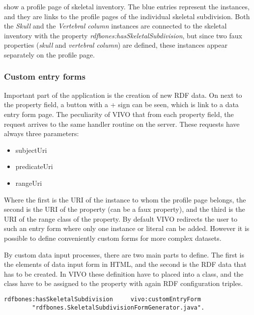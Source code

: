 

 show a profile page of skeletal inventory. The blue entries represent the instances, and they are links to the profile pages of the individual skeletal subdivision. Both the \textit{Skull} and the \textit{Vertebral column} instances are connected to the skeletal inventory with the property \textit{rdfbones:hasSkeletalSubdivision}, but since two faux properties (\textit{skull} and \textit{vertebral column}) are defined, these instances appear separately on the profile page.

\subsubsection{Custom entry forms} \label{vivoCef}

Important part of the application is the creation of new RDF data. On  next to the property field, a button with a + sign can be seen, which is link to a data entry form page. The peculiarity of VIVO that from each property field, the request arrives to the same handler routine on the server. These requests have always three parameters:

\begin{itemize}
	\item{subjectUri}
	\item{predicateUri}
	\item{rangeUri}
\end{itemize}

Where the first is the URI of the instance to whom the profile page belongs, the second is the URI of the property (can be a faux property), and the third is the URI of the range class of the property. By default VIVO redirects the user to such an entry form where only one instance or literal can be added. However it is possible to define conveniently custom forms for more complex datasets.

By custom data input processes, there are two main parts to define. The first is the elements of data input form in HTML, and the second is the RDF data that has to be created. In VIVO these definition have to placed into a class, and the class have to be assigned to the property with again RDF configuration triples. 

\begin{lstlisting}[captionpos=b, caption= Entry form generator class definition, label=skullJSON, belowskip=1em, aboveskip=2em,
basicstyle=\footnotesize,frame=single]
rdfbones:hasSkeletalSubdivision		vivo:customEntryForm	
		"rdfbones.SkeletalSubdivisionFormGenerator.java".
\end{lstlisting}

